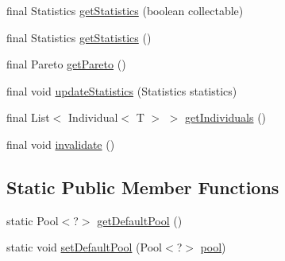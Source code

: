 \begin{DoxyCompactItemize}
\item 
final Statistics \hyperlink{classjenes_1_1population_1_1_population_3_01_t_01extends_01_chromosome_01_4_abedc5b29d8fe8d17dcd233c290df7dce}{get\-Statistics} (boolean collectable)
\item 
final Statistics \hyperlink{classjenes_1_1population_1_1_population_3_01_t_01extends_01_chromosome_01_4_a5ac2e746b619d828955f36df17b96449}{get\-Statistics} ()
\item 
final Pareto \hyperlink{classjenes_1_1population_1_1_population_3_01_t_01extends_01_chromosome_01_4_a608df5ac997f7f803841c1ca8c63b4f6}{get\-Pareto} ()
\item 
final void \hyperlink{classjenes_1_1population_1_1_population_3_01_t_01extends_01_chromosome_01_4_a2c25dfd7e794dda3bd77926a1bebc099}{update\-Statistics} (Statistics statistics)
\item 
final List$<$ Individual$<$ T $>$ $>$ \hyperlink{classjenes_1_1population_1_1_population_3_01_t_01extends_01_chromosome_01_4_a2b35c7d7dfa8e6463339505c56742ada}{get\-Individuals} ()
\item 
final void \hyperlink{classjenes_1_1population_1_1_population_3_01_t_01extends_01_chromosome_01_4_aea1e2d97d600c0f895ae347cdcd8f2b0}{invalidate} ()
\end{DoxyCompactItemize}
\subsection*{Static Public Member Functions}
\begin{DoxyCompactItemize}
\item 
static Pool$<$?$>$ \hyperlink{classjenes_1_1population_1_1_population_3_01_t_01extends_01_chromosome_01_4_adf33dd4053815e1ec5e1f7026e2fef19}{get\-Default\-Pool} ()
\item 
static void \hyperlink{classjenes_1_1population_1_1_population_3_01_t_01extends_01_chromosome_01_4_a23696a2d226ab74e263d141b91864efd}{set\-Default\-Pool} (Pool$<$?$>$ \hyperlink{classjenes_1_1population_1_1_population_3_01_t_01extends_01_chromosome_01_4_a4923c4758a9688ce2c0dce823b79f729}{pool})
\end{DoxyCompactItemize}
